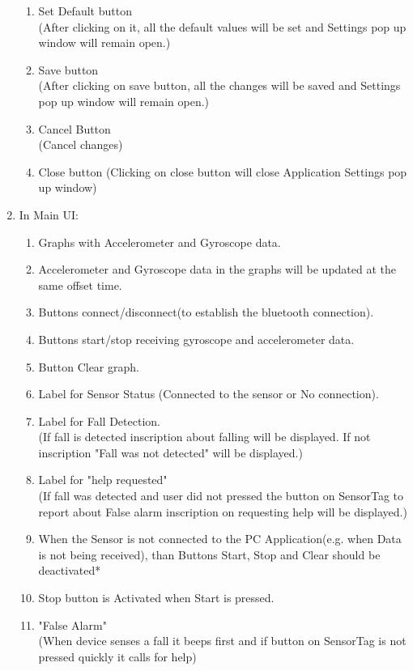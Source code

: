 \documentclass[conference,12pt]{IEEETran}
\begin{document}
\begin{enumerate}
\begin{enumerate}
		\item Set Default button\\
		 (After clicking on it, all the default values will be set and Settings pop up window will remain open.)
		 \item Save button\\
		 (After clicking on save button, all the changes will be saved and Settings pop up window will remain open.)
		 \item Cancel Button\\
		 (Cancel changes)
		 \item Close button
		 (Clicking on close button will close Application Settings pop up window) 
	\end{enumerate}
	\item In Main UI:
	\begin{enumerate}
		\item Graphs with Accelerometer and Gyroscope data.
		\item Accelerometer and Gyroscope data in the graphs will be updated at the same offset time.
		\item Buttons connect/disconnect(to establish the bluetooth connection).
		\item Buttons start/stop receiving gyroscope and accelerometer data.
		\item Button Clear graph.
		\item Label for Sensor Status (Connected to the sensor or No connection).
		\item Label for Fall Detection.\\
		(If fall is detected inscription about falling will be displayed.
		If not  inscription "Fall was not detected" will be displayed.)
		\item Label for "help requested"\\
		(If fall was detected and user did not pressed the button on SensorTag to report about False alarm inscription on requesting help will be displayed.)
		\item When the Sensor is not connected to the PC Application(e.g. when Data is not being received), than Buttons Start, Stop and Clear should be deactivated*
		\item Stop button is Activated when Start is pressed.
		\item "False Alarm" \\
		(When device senses a fall it beeps first and if button on 	SensorTag is not pressed quickly it calls for help)
	\end{enumerate}
\end{enumerate}
\end{document}
